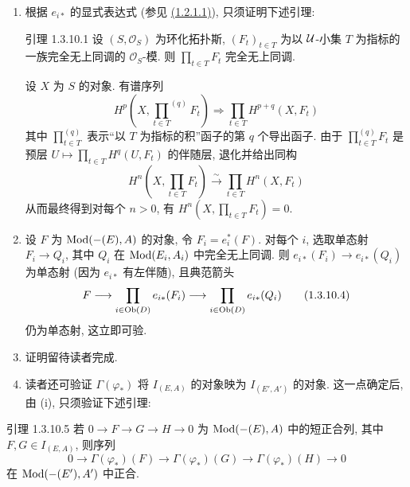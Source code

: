 
\begin{enumerate}
\renewcommand{\theenumi}{\roman{enumi}}
\renewcommand{\labelenumi}{(\theenumi)}
\item 根据 $e_{i\ast}$ 的显式表达式
(参见 \hyperref[Vbis.cor1.2.11]{(1.2.1.1)}), 只须证明下述引理:

\begin{enonce*}{引理 1.3.10.1}
设\pageoriginale{} $(S,\mathcal O_S)$ 为环化拓扑斯,
$(F_t)_{t\in T}$ 为以 ${\mathcal U}$-小集 $T$ 为指标的一族完全无上同调的 $\mathcal O_S$-模.
则 $\prod_{t\in T}F_t$ 完全无上同调.
\end{enonce*}

设 $X$ 为 $S$ 的对象. 有谱序列
\begin{equation*}
H^p\left(X,{\mathop{\prod}_{t\in T}}^{(q)}F_t\right)\Rightarrow
\mathop{\prod}_{t\in T}H^{p+q}(X,F_t)\tag{1.3.10.2}
\end{equation*}
其中 $\prod_{t\in T}^{(q)}$ 表示“以 $T$ 为指标的积”函子的第 $q$ 个导出函子.
由于 $\prod_{t\in T}^{(q)}F_t$ 是预层 $U\mapsto\prod_{t\in T}H^q(U,F_t)$ 的伴随层,
 退化并给出同构
\begin{equation*}
H^n\left(X,\prod_{t\in T}F_t\right)\xrightarrow{\sim}
\prod_{t\in T}H^n(X,F_t)\tag{1.3.10.3}
\end{equation*}
从而最终得到对每个 $n>0$, 有 $H^n(X,\prod_{t\in T}F_t)=0$.

\item 设 $F$ 为 $\Mod(\Ysheaf{\Gamma}(E),A)$ 的对象, 令 $F_i=e_i^{\ast}(F)$.
对每个 $i$, 选取单态射 $F_i\to Q_i$,
其中 $Q_i$ 在 $\operatorname{Mod}(E_i,A_i)$ 中完全无上同调.
则 $e_{i\ast}(F_i)\to e_{i\ast}(Q_i)$ 为单态射
(因为 $e_{i\ast}$ 有左伴随), 且典范箭头
\begin{equation*}
F\to\prod_{i\in\Ob(D)}e_{i\ast}(F_i)\to
\prod_{i\in\Ob(D)}e_{i\ast}(Q_i)\tag{1.3.10.4}
\end{equation*}
仍为单态射, 这立即可验.

\item 证明留待读者完成.

\item 读者还可验证 $\Gamma(\varphi_{\ast})$ 将 $I_{(E,A)}$ 的对象映为
$I_{(E',A')}$ 的对象. 这一点确定后, 由 (i), 只须验证下述引理:
\end{enumerate}

\begin{enonce*}{引理 1.3.10.5}
若\pageoriginale{} $0\to F\to G\to H\to0$ 为 $\Mod(\Ysheaf{\Gamma}(E),A)$ 中的短正合列,
其中 $F,G\in I_{(E,A)}$, 则序列
$$
0\to\Gamma(\varphi_{\ast})(F)\to
\Gamma(\varphi_{\ast})(G)\to
\Gamma(\varphi_{\ast})(H)\to0
$$
在 $\Mod(\Ysheaf{\Gamma}(E'),A')$ 中正合.
\end{enonce*}


